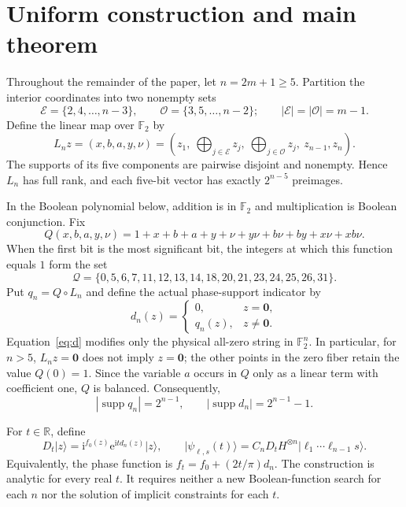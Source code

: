 \documentclass[11pt,a4paper]{article}
\numberwithin{equation}{section}
\theoremstyle{definition}
\newcommand{\F}{\mathbb F}
\newcommand{\R}{\mathbb R}
\newcommand{\ii}{\mathrm i}
\newcommand{\ee}{\mathrm e}
\newcommand{\supp}{\operatorname{supp}}
\newcommand{\ket}[1]{\lvert#1\rangle}
\newcommand{\E}{\mathcal E}
\newcommand{\Oset}{\mathcal O}
\newcommand{\zero}{\bm 0}
\begin{document}
\section{Uniform construction and main theorem}
\label{sec:construction}

Throughout the remainder of the paper, let $n=2m+1\geq5$. Partition the interior coordinates into two nonempty sets
\begin{equation}
 \E=\{2,4,\ldots,n-3\},\qquad
 \Oset=\{3,5,\ldots,n-2\};
 \qquad |\E|=|\Oset|=m-1.
\end{equation}
Define the linear map over $\F_2$ by
\begin{equation}
 L_nz=(x,b,a,y,\nu)
 =\left(z_1,\ \bigoplus_{j\in\E}z_j,\
              \bigoplus_{j\in\Oset}z_j,\ z_{n-1},z_n\right).
 \label{eq:L}
\end{equation}
The supports of its five components are pairwise disjoint and nonempty. Hence $L_n$ has full rank, and each five-bit vector has exactly $2^{n-5}$ preimages.

In the Boolean polynomial below, addition is in $\F_2$ and multiplication is Boolean conjunction. Fix
\begin{equation}
 \boxed{\ Q(x,b,a,y,\nu)
 =1+x+b+a+y+\nu+y\nu+b\nu+by+x\nu+xb\nu.\ }
 \label{eq:Q}
\end{equation}
When the first bit is the most significant bit, the integers at which this function equals $1$ form the set
\begin{equation}
 \mathcal Q=\{0,5,6,7,11,12,13,14,18,20,21,23,24,25,26,31\}.
 \label{eq:Qsupport}
\end{equation}
Put $q_n=Q\circ L_n$ and define the actual phase-support indicator by
\begin{equation}
 d_n(z)=
 \begin{cases}0,&z=\zero,\\q_n(z),&z\ne\zero.\end{cases}
 \label{eq:d}
\end{equation}
Equation~\eqref{eq:d} modifies only the physical all-zero string in $\F_2^n$. In particular, for $n>5$, $L_nz=\zero$ does not imply $z=\zero$; the other points in the zero fiber retain the value $Q(0)=1$. Since the variable $a$ occurs in $Q$ only as a linear term with coefficient one, $Q$ is balanced. Consequently,
\begin{equation}
 |\supp q_n|=2^{n-1},\qquad |\supp d_n|=2^{n-1}-1.
\end{equation}

For $t\in\R$, define
\begin{equation}
 D_t\ket z=\ii^{f_0(z)}\ee^{\ii t d_n(z)}\ket z,
 \qquad
 \ket{\psi_{\ell,s}(t)}=C_nD_tH^{\otimes n}\ket{\ell_1\cdots\ell_{n-1}s}.
 \label{eq:states}
\end{equation}
Equivalently, the phase function is $f_t=f_0+(2t/\pi)d_n$. The construction is analytic for every real $t$. It requires neither a new Boolean-function search for each $n$ nor the solution of implicit constraints for each $t$.
\end{document}
